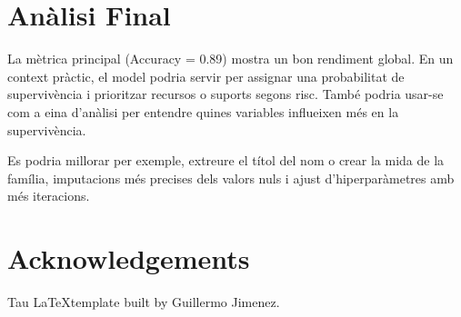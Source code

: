 \documentclass[9pt,a4paper,twoside]{tau-class/tau}
\begin{document}
\section{Anàlisi Final}
La mètrica principal (Accuracy = 0.89) mostra un bon rendiment global. En un context pràctic, el model podria servir per assignar una probabilitat de supervivència i prioritzar recursos o suports segons risc. També podria usar-se com a eina d’anàlisi per entendre quines variables influeixen més en la supervivència.

Es podria millorar per exemple, extreure el títol del nom o crear la mida de la família, imputacions més precises dels valors nuls i ajust d'hiperparàmetres amb més iteracions.

\section{Acknowledgements}

Tau \LaTeX template built by Guillermo Jimenez.


\printbibliography

\end{document}
